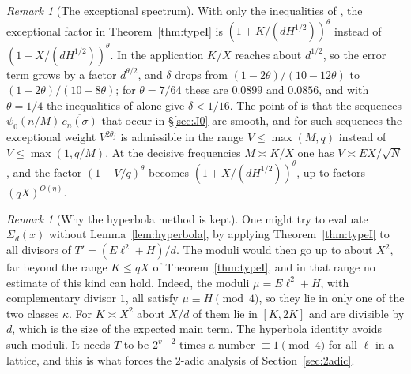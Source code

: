 \documentclass[11pt]{amsart}
\theoremstyle{remark}
\newtheorem{remark}[theorem]{Remark}
\theoremstyle{definition}
\numberwithin{equation}{section}
\begin{document}
\begin{remark}[The exceptional spectrum]\label{rem:exceptional}
With only the inequalities of \cite{DI}, the exceptional factor in Theorem~\ref{thm:typeI} is $(1+K/(dH^{1/2}))^\theta$ instead of $(1+X/(dH^{1/2}))^\theta$. In the application $K/X$ reaches about $d^{1/2}$, so the error term grows by a factor $d^{\theta/2}$, and $\delta$ drops from $(1-2\theta)/(10-12\theta)$ to $(1-2\theta)/(10-8\theta)$; for $\theta=7/64$ these are $0.0899$ and $0.0856$, and with $\theta=1/4$ the inequalities of \cite{DI} alone give $\delta<1/16$. The point of \cite[Theorem~2]{Pas} is that the sequences $\psi_0(n/M)\,\overline{c_n(\sigma)}$ that occur in \S\ref{sec:J0} are smooth, and for such sequences the exceptional weight $V^{2\theta_j}$ is admissible in the range $V\le\max(M,q)$ instead of $V\le\max(1,q/M)$. At the decisive frequencies $M\asymp K/X$ one has $V\asymp EX/\sqrt N$, and the factor $(1+V/q)^\theta$ becomes $(1+X/(dH^{1/2}))^\theta$, up to factors $(qX)^{O(\eta)}$.
\end{remark}

\begin{remark}[Why the hyperbola method is kept]\label{rem:complementary}
One might try to evaluate $\Sigma_d(x)$ without Lemma~\ref{lem:hyperbola}, by applying Theorem~\ref{thm:typeI} to all divisors of $T'=(E\ell^2+H)/d$. The moduli would then go up to about $X^2$, far beyond the range $K\le qX$ of Theorem~\ref{thm:typeI}, and in that range no estimate of this kind can hold. Indeed, the moduli $\mu=E\ell^2+H$, with complementary divisor $1$, all satisfy $\mu\equiv H\pmod 4$, so they lie in only one of the two classes $\kappa$. For $K\asymp X^2$ about $X/d$ of them lie in $[K,2K]$ and are divisible by $d$, which is the size of the expected main term. The hyperbola identity avoids such moduli. It needs $T$ to be $2^{v-2}$ times a number $\equiv1\pmod 4$ for all $\ell$ in a lattice, and this is what forces the $2$-adic analysis of Section~\ref{sec:2adic}.
\end{remark}
\end{document}
